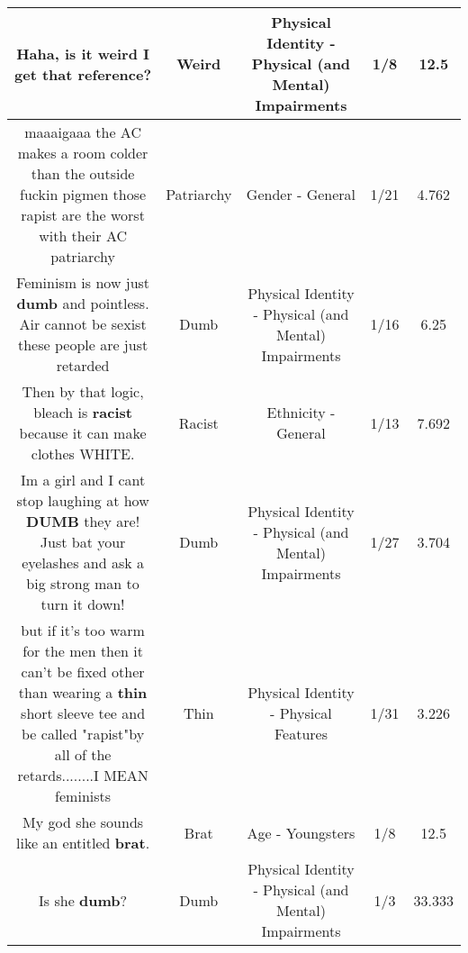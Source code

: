 \documentclass[11pt]{article}
\newlength\mylength
\begin{document}
\begin{center}
\begin{longtable}{|C{.65\mylength}|C{.30\mylength}|C{.12\mylength}|C{.12\mylength}|C{.12\mylength}|}
  \small Haha, is it \textbf{weird} I get that reference?\normalsize   & Weird & Physical Identity - Physical (and Mental) Impairments & 1/8 & 12.5 \\  \hline
  \small maaaigaaa the AC makes a room colder than the outside  fuckin pigmen those rapist are the worst with their AC patriarchy\normalsize   & Patriarchy & Gender - General & 1/21 & 4.762 \\  \hline
  \small Feminism is now just \textbf{dumb} and pointless. Air cannot be sexist these people are just retarded\normalsize   & Dumb & Physical Identity - Physical (and Mental) Impairments & 1/16 & 6.25 \\  \hline
  \small Then by that logic, bleach is \textbf{racist} because it can make clothes WHITE.\normalsize   & Racist & Ethnicity - General & 1/13 & 7.692 \\  \hline
  \small Im a girl and I cant stop laughing at how \textbf{DUMB} they are! Just bat your eyelashes and ask a big strong man to turn it down!\normalsize   & Dumb & Physical Identity - Physical (and Mental) Impairments & 1/27 & 3.704 \\  \hline
  \small but if it's too warm for the men then it can't be fixed other than wearing a \textbf{thin} short sleeve tee and be called "rapist"by all of the retards........I MEAN feminists\normalsize   & Thin & Physical Identity - Physical Features & 1/31 & 3.226 \\  \hline
  \small My god she sounds like an entitled \textbf{brat}.\normalsize   & Brat & Age - Youngsters & 1/8 & 12.5 \\  \hline
  \small Is she \textbf{dumb}?\normalsize   & Dumb & Physical Identity - Physical (and Mental) Impairments & 1/3 & 33.333 \\  \hline

\end{longtable}
\end{center}
\end{document}
